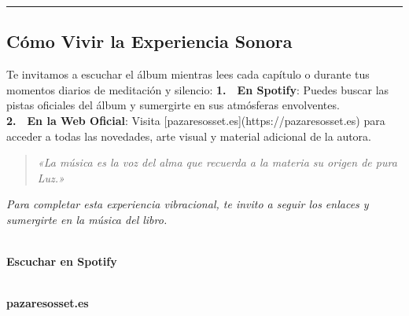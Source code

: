 \vspace{0.4cm}
\begin{center}
\rule{0.35\textwidth}{0.4pt}
\end{center}
\vspace{0.4cm}


\subsection*{Cómo Vivir la Experiencia Sonora}
Te invitamos a escuchar el álbum mientras lees cada capítulo o durante tus momentos diarios de meditación y silencio:
\noindent\textbf{1.}~~\textbf{En Spotify}: Puedes buscar las pistas oficiales del álbum y sumergirte en sus atmósferas envolventes.\\

\noindent\textbf{2.}~~\textbf{En la Web Oficial}: Visita [pazaresosset.es](https://pazaresosset.es) para acceder a todas las novedades, arte visual y material adicional de la autora.\\




\begin{quote}
\itshape \textit{«La música es la voz del alma que recuerda a la materia su origen de pura Luz.»}
\end{quote}

\vspace{1.5cm}
\begin{center}
\textit{Para completar esta experiencia vibracional, te invito a seguir los enlaces y sumergirte en la música del libro.}\\
\vspace{1cm}
\begin{minipage}{0.45\textwidth}
\centering
{}\\
\vspace{0.4cm}\textbf{Escuchar en Spotify}
\end{minipage}\hfill
\begin{minipage}{0.45\textwidth}
\centering
{}\\
\vspace{0.4cm}\textbf{pazaresosset.es}
\end{minipage}
\end{center}